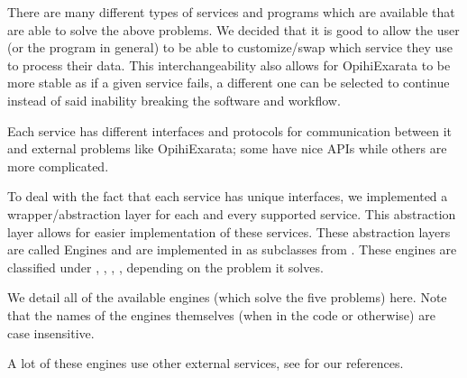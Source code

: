 \documentclass[letterpaper,11pt,english]{sphinxmanual}
\begin{document}
\sphinxAtStartPar
There are many different types of services and programs which are available
that are able to solve the above problems. We decided that it is good to
allow the user (or the program in general) to be able to customize/swap which
service they use to process their data. This interchangeability also allows
for OpihiExarata to be more stable as if a given service fails, a different
one can be selected to continue instead of said inability breaking the
software and workflow.

\sphinxAtStartPar
Each service has different interfaces and protocols for communication between
it and external problems like OpihiExarata; some have nice APIs while others
are more complicated.

\sphinxAtStartPar
To deal with the fact that each service has unique interfaces, we implemented
a wrapper/abstraction layer for each and every supported service. This
abstraction layer allows for easier implementation of these services.
These abstraction layers are called Engines and are implemented in as
subclasses from {\hyperref[\detokenize{code/opihiexarata.library.engine:module-opihiexarata.library.engine}]{}}. These engines are
classified under
{\hyperref[\detokenize{technical/architecture/services_engines:technical-architecture-services-engines-astrometryengines}]{}},
{\hyperref[\detokenize{technical/architecture/services_engines:technical-architecture-services-engines-photometryengines}]{}},
{\hyperref[\detokenize{technical/architecture/services_engines:technical-architecture-services-engines-orbitengines}]{}},
{\hyperref[\detokenize{technical/architecture/services_engines:technical-architecture-services-engines-ephemerisengines}]{}},
{\hyperref[\detokenize{technical/architecture/services_engines:technical-architecture-services-engines-propagateengines}]{}}
depending on the problem it solves.

\sphinxAtStartPar
We detail all of the available engines (which solve the five problems) here.
Note that the names of the engines themselves (when in the code or otherwise)
are case insensitive.

\sphinxAtStartPar
A lot of these engines use other external services, see {\hyperref[\detokenize{user/citations:user-citations}]{}}
for our references.
\end{document}
